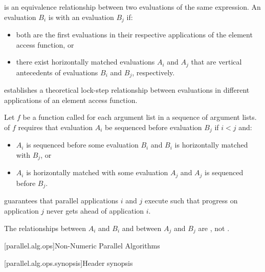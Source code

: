 \pnum
{} is an equivalence relationship between two
evaluations of the same expression. An evaluation $B_i$ is
 with an evaluation $B_j$ if:

\begin{itemize}
\item both are the first evaluations in their respective applications of the element access function, or
\item there exist horizontally matched evaluations $A_i$ and $A_j$ that are vertical antecedents of evaluations $B_i$ and $B_j$, respectively.
\end{itemize}

\begin{note} establishes a theoretical lock-step relationship between evaluations in different applications of an element access function.\end{note}

\pnum
Let $f$ be a function called for each argument list in a sequence of argument lists.  of $f$ requires that evaluation $A_i$ be sequenced before evaluation $B_j$ if $i < j$ and:

\begin{itemize}
\item $A_i$ is sequenced before some evaluation $B_i$ and $B_i$ is horizontally matched with $B_j$, or
\item $A_i$ is horizontally matched with some evaluation $A_j$ and $A_j$ is sequenced before $B_j$.
\end{itemize}

\begin{note}
 guarantees that parallel applications $i$ and $j$ execute such that progress on application $j$ never gets ahead of application $i$.
\end{note}
\begin{note}
The relationships between $A_i$ and $B_i$ and between $A_j$ and $B_j$ are , not .
\end{note}

[parallel.alg.ops]{Non-Numeric Parallel Algorithms}

[parallel.alg.ops.synopsis]{Header  synopsis}

